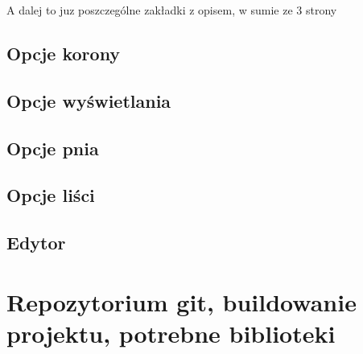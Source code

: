 A dalej to juz poszczególne zakładki z opisem, w sumie ze 3 strony
\subsection{Opcje korony}
\subsection{Opcje wyświetlania}
\subsection{Opcje pnia}
\subsection{Opcje liści}
\subsection{Edytor}
\section{Repozytorium git, buildowanie projektu, potrebne biblioteki}
